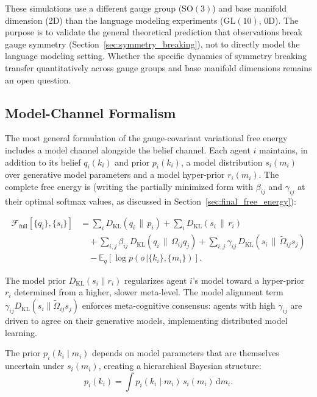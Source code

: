 \documentclass[twoside,11pt]{article}
\begin{document}
These simulations use a different gauge group ($\mathrm{SO}(3)$) and base manifold dimension (2D) than the language modeling experiments ($\mathrm{GL}(10)$, 0D). The purpose is to validate the general theoretical prediction that observations break gauge symmetry (Section~\ref{sec:symmetry_breaking}), not to directly model the language modeling setting. Whether the specific dynamics of symmetry breaking transfer quantitatively across gauge groups and base manifold dimensions remains an open question.


\subsection{Model-Channel Formalism}
\label{app:model_channel}

The most general formulation of the gauge-covariant variational free energy includes a model channel alongside the belief channel. Each agent $i$ maintains, in addition to its belief $q_i(k_i)$ and prior $p_i(k_i)$, a model distribution $s_i(m_i)$ over generative model parameters and a model hyper-prior $r_i(m_i)$. The complete free energy is (writing the partially minimized form with $\beta_{ij}$ and $\gamma_{ij}$ at their optimal softmax values, as discussed in Section~\ref{sec:final_free_energy}):

\begin{equation}
\begin{aligned}
\mathcal{F}_{\text{full}}[\{q_i\},\{s_i\}]
&=\sum_i D_{\mathrm{KL}}(q_i\,\|\,p_i)
+\sum_i D_{\mathrm{KL}}(s_i\,\|\,r_i)\\
&\quad+\sum_{i,j}\beta_{ij}\,D_{\mathrm{KL}}(q_i\,\|\,\Omega_{ij}q_j)
+\sum_{i,j}\gamma_{ij}\,D_{\mathrm{KL}}(s_i\,\|\,\tilde{\Omega}_{ij}s_j)\\
&\quad-\mathbb{E}_q[\log p(o\,|\{k_i\},\{m_i\})].
\end{aligned}
\label{eq:free_energy_full}
\end{equation}

The model prior $D_{\mathrm{KL}}(s_i \| r_i)$ regularizes agent $i$'s model toward a hyper-prior $r_i$ determined from a higher, slower meta-level. The model alignment term $\gamma_{ij} D_{\mathrm{KL}}(s_i \| \tilde{\Omega}_{ij} s_j)$ enforces meta-cognitive consensus: agents with high $\gamma_{ij}$ are driven to agree on their generative models, implementing distributed model learning.

The prior $p_i(k_i \mid m_i)$ depends on model parameters that are themselves uncertain under $s_i(m_i)$, creating a hierarchical Bayesian structure:
\begin{equation}
p_i(k_i) = \int p_i(k_i \mid m_i) \, s_i(m_i) \, \mathrm{d}m_i.
\end{equation}
\end{document}
